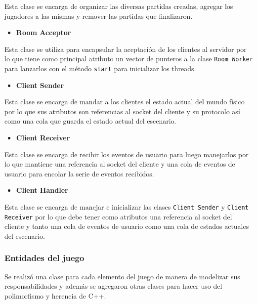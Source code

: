 \documentclass[a4paper]{article}
\begin{document}
Esta clase se encarga de organizar las diversas partidas creadas, agregar los jugadores a las mismas y remover las partidas que finalizaron.

\begin{itemize}
	\item \textbf{Room Acceptor}
\end{itemize}

Esta clase se utiliza para encapsular la aceptación de los clientes al servidor por lo que tiene como principal atributo un vector de punteros a la clase \texttt{Room Worker} para lanzarlos con el método \texttt{start} para inicializar los threads.

\begin{itemize}
	\item \textbf{Client Sender}
\end{itemize}

Esta clase se encarga de mandar a los clientes el estado actual del mundo físico por lo que sus atributos son referencias al socket del cliente y su protocolo así como una cola que guarda el estado actual del escenario.

\begin{itemize}
	\item \textbf{Client Receiver}
\end{itemize}

Esta clase se encarga de recibir los eventos de usuario para luego manejarlos por lo que mantiene una referencia al socket del cliente y una cola de eventos de usuario para encolar la serie de eventos recibidos.

\begin{itemize}
	\item \textbf{Client Handler}
\end{itemize}

Esta clase se encarga de manejar e inicializar las clases \texttt{Client Sender} y \texttt{Client Receiver} por lo que debe tener como atributos una referencia al socket del cliente y tanto una cola de eventos de usuario como una cola de estados actuales del escenario.
	
\subsubsection{Entidades del juego}

Se realizó una clase para cada elemento del juego de manera de modelizar sus responsabilidades y además se agregaron otras clases para hacer uso del polimorfismo y herencia de C++.
\end{document}
